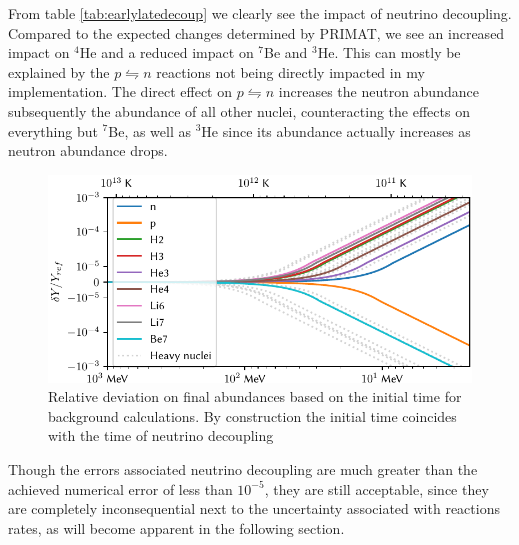 From table \ref{tab:earlylatedecoup} we clearly see the impact of neutrino decoupling. Compared to the expected changes determined by PRIMAT\cite{PRIMAT}, we see an increased impact on ${}^4$He and a reduced impact on ${}^7$Be and ${}^3$He. This can mostly be explained by the $p\leftrightharpoons n$ reactions not being directly impacted in my implementation. The direct effect on $p\leftrightharpoons n$ increases the neutron abundance subsequently the abundance of all other nuclei, counteracting the effects on everything but ${}^7$Be, as well as ${}^3$He since its abundance actually increases as neutron abundance drops.%
\begin{figure}[ht]
    \includegraphics[width=5.1in]{figures/initime.pdf}
    \caption{Relative deviation on final abundances based on the initial time for background calculations. By construction the initial time coincides with the time of neutrino decoupling}
    \label{fig:initime}
\end{figure}

Though the errors associated neutrino decoupling are much greater than the achieved numerical error of less than $10^{-5}$, they are still acceptable, since they are completely inconsequential next to the uncertainty associated with reactions rates, as will become apparent in the following section.


